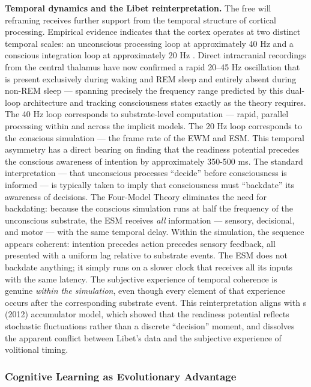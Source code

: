 \documentclass[12pt]{article}
\begin{document}
\textbf{Temporal dynamics and the Libet reinterpretation.} The free will reframing receives further support from the temporal structure of cortical processing. Empirical evidence indicates that the cortex operates at two distinct temporal scales: an unconscious processing loop at approximately 40 Hz and a conscious integration loop at approximately 20 Hz \citep[cf.][]{Gruber2015,Llinas1993,Engel2001}. Direct intracranial recordings from the central thalamus have now confirmed a rapid 20--45 Hz oscillation that is present exclusively during waking and REM sleep and entirely absent during non-REM sleep \citep{Chowdhury2026} --- spanning precisely the frequency range predicted by this dual-loop architecture and tracking consciousness states exactly as the theory requires. The 40 Hz loop corresponds to substrate-level computation --- rapid, parallel processing within and across the implicit models. The 20 Hz loop corresponds to the conscious simulation --- the frame rate of the EWM and ESM. This temporal asymmetry has a direct bearing on \citet{Libet1985} finding that the readiness potential precedes the conscious awareness of intention by approximately 350-500 ms. The standard interpretation --- that unconscious processes ``decide'' before consciousness is informed --- is typically taken to imply that consciousness must ``backdate'' its awareness of decisions. The Four-Model Theory eliminates the need for backdating: because the conscious simulation runs at half the frequency of the unconscious substrate, the ESM receives \emph{all} information --- sensory, decisional, and motor --- with the same temporal delay. Within the simulation, the sequence appears coherent: intention precedes action precedes sensory feedback, all presented with a uniform lag relative to substrate events. The ESM does not backdate anything; it simply runs on a slower clock that receives all its inputs with the same latency. The subjective experience of temporal coherence is genuine \emph{within the simulation}, even though every element of that experience occurs after the corresponding substrate event. This reinterpretation aligns with \citeauthor{Schurger2012}\textquotesingle s (2012) accumulator model, which showed that the readiness potential reflects stochastic fluctuations rather than a discrete ``decision'' moment, and dissolves the apparent conflict between Libet's data and the subjective experience of volitional timing.


\subsubsection{Cognitive Learning as Evolutionary Advantage}
\end{document}
